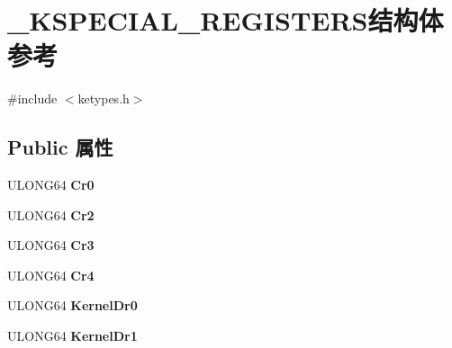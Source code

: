 \hypertarget{struct___k_s_p_e_c_i_a_l___r_e_g_i_s_t_e_r_s}{}\section{\+\_\+\+K\+S\+P\+E\+C\+I\+A\+L\+\_\+\+R\+E\+G\+I\+S\+T\+E\+R\+S结构体 参考}
\label{struct___k_s_p_e_c_i_a_l___r_e_g_i_s_t_e_r_s}


{\ttfamily \#include $<$ketypes.\+h$>$}

\subsection*{Public 属性}
\begin{DoxyCompactItemize}
\item 
\mbox{\label{struct___k_s_p_e_c_i_a_l___r_e_g_i_s_t_e_r_s_a38121e17a1e7557db45582be0c667aae}} 
U\+L\+O\+N\+G64 {\bfseries Cr0}
\item 
\mbox{\label{struct___k_s_p_e_c_i_a_l___r_e_g_i_s_t_e_r_s_aac6d49442a7c3435cd7b443d5e70defe}} 
U\+L\+O\+N\+G64 {\bfseries Cr2}
\item 
\mbox{\label{struct___k_s_p_e_c_i_a_l___r_e_g_i_s_t_e_r_s_aa90b1a2cbc2294014a07fe18fc79e563}} 
U\+L\+O\+N\+G64 {\bfseries Cr3}
\item 
\mbox{\label{struct___k_s_p_e_c_i_a_l___r_e_g_i_s_t_e_r_s_afc486719fc56cf504a322096386510a5}} 
U\+L\+O\+N\+G64 {\bfseries Cr4}
\item 
\mbox{\label{struct___k_s_p_e_c_i_a_l___r_e_g_i_s_t_e_r_s_a1a1ac2bbdf652eec56041ed2796e7d87}} 
U\+L\+O\+N\+G64 {\bfseries Kernel\+Dr0}
\item 
\mbox{\label{struct___k_s_p_e_c_i_a_l___r_e_g_i_s_t_e_r_s_a73b19c5664ccaea4152a8535db81e5ed}} 
U\+L\+O\+N\+G64 {\bfseries Kernel\+Dr1}
\item 
\mbox{\label{struct___k_s_p_e_c_i_a_l___r_e_g_i_s_t_e_r_s_a651483114b065411be06390c4a95a3ff}} 

\end{DoxyCompactItemize}
